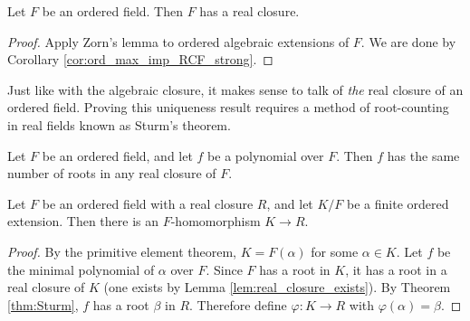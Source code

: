 \begin{lemma}
  \label{lem:real_closure_exists}
  Let $F$ be an ordered field. Then $F$ has a real closure.
\end{lemma}
\begin{proof}
  Apply Zorn's lemma to ordered algebraic extensions of $F$. We are done by Corollary \ref{cor:ord_max_imp_RCF_strong}.
\end{proof}

Just like with the algebraic closure, it makes sense to talk of \textit{the} real closure of an ordered field. Proving this uniqueness result requires a method of root-counting in real fields known as Sturm's theorem.

\begin{theorem}
  \label{thm:Sturm}
  Let $F$ be an ordered field, and let $f$ be a polynomial over $F$. Then $f$ has the same number of roots in any real closure of $F$.
\end{theorem}

\begin{lemma}
  \label{lem:closure_emb_ext_unordered}
  Let $F$ be an ordered field with a real closure $R$, and let $K/F$ be a finite ordered extension. Then there is an $F$-homomorphism $K\to R$.
\end{lemma}
\begin{proof}
  By the primitive element theorem, $K=F(\alpha)$ for some $\alpha\in K$. Let $f$ be the minimal polynomial of $\alpha$ over $F$. Since $F$ has a root in $K$, it has a root in a real closure of $K$ (one exists by Lemma \ref{lem:real_closure_exists}). By Theorem \ref{thm:Sturm}, $f$ has a root $\beta$ in $R$. Therefore define $\varphi:K\to R$ with $\varphi(\alpha)=\beta$.
\end{proof}


